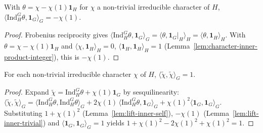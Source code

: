 \begin{lemma}
    \label{lem:lift-inner-trivial}
    With $\theta = \chi - \chi(1)\mathbf 1_H$ for $\chi$ a non-trivial irreducible
    character of $H$, $\langle \mathrm{Ind}_H^G\theta, \mathbf 1_G\rangle_G =
    -\chi(1)$.
\end{lemma}
\begin{proof}
    Frobenius reciprocity gives $\langle \mathrm{Ind}_H^G\theta, \mathbf
    1_G\rangle_G = \langle \theta, \mathbf 1_G|_H\rangle_H = \langle \theta,
    \mathbf 1_H\rangle_H$. With $\theta = \chi - \chi(1)\mathbf 1_H$ and
    $\langle\chi,\mathbf 1_H\rangle_H = 0$,
    $\langle\mathbf 1_H,\mathbf 1_H\rangle_H = 1$
    (Lemma~\ref{lem:character-inner-product-integer}), this is $-\chi(1)$.
\end{proof}

\begin{lemma}
    \label{lem:lift-norm-one}
    For each non-trivial irreducible character $\chi$ of $H$, $\langle
    \widetilde{\chi}, \widetilde{\chi} \rangle_G = 1$.
\end{lemma}
\begin{proof}
    Expand $\widetilde{\chi} = \mathrm{Ind}_H^G\theta + \chi(1)\mathbf 1_G$ by
    sesquilinearity:
    $\langle\widetilde\chi,\widetilde\chi\rangle_G = \langle
    \mathrm{Ind}_H^G\theta,\mathrm{Ind}_H^G\theta\rangle_G + 2\chi(1)\,\langle
    \mathrm{Ind}_H^G\theta,\mathbf 1_G\rangle_G + \chi(1)^2\langle\mathbf
    1_G,\mathbf 1_G\rangle_G$. Substituting $1+\chi(1)^2$
    (Lemma~\ref{lem:lift-inner-self}), $-\chi(1)$
    (Lemma~\ref{lem:lift-inner-trivial}) and $\langle\mathbf 1_G,\mathbf
    1_G\rangle_G = 1$ yields $1 + \chi(1)^2 - 2\chi(1)^2 + \chi(1)^2 = 1$.
\end{proof}

